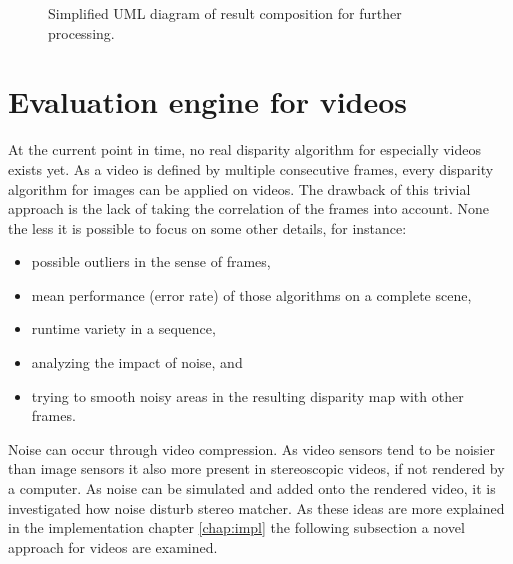 \begin{figure}[h!]
  \centering
  \caption{Simplified UML diagram of result composition for further processing.}
\end{figure}


\section{Evaluation engine for videos}

At the current point in time, no real disparity algorithm for especially videos exists yet.
As a video is defined by multiple consecutive frames, every disparity algorithm for images can be applied on videos.
The drawback of this trivial approach is the lack of taking the correlation of the frames into account.
None the less it is possible to focus on some other details, for instance:

\begin{itemize}
  \item possible outliers in the sense of frames,
  \item mean performance (error rate) of those algorithms on a complete scene,
  \item runtime variety in a sequence,
  \item analyzing the impact of noise, and
  \item trying to smooth noisy areas in the resulting disparity map with other frames.
\end{itemize}

\noindent Noise can occur through video compression.
As video sensors tend to be noisier than image sensors it also more present in stereoscopic videos, if not rendered by a computer.
As noise can be simulated and added onto the rendered video, it is investigated how noise disturb stereo matcher.
As these ideas are more explained in the implementation chapter \ref{chap:impl} the following subsection a novel approach for videos are examined.

